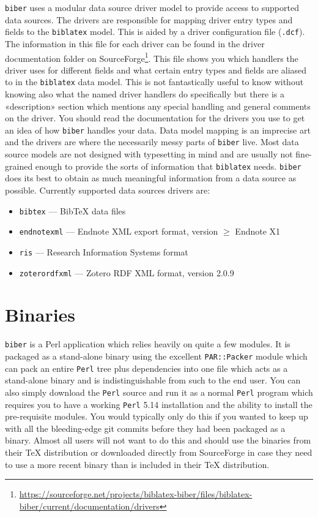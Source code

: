 \documentclass{ltxdockit}
\begin{document}
\verb+biber+ uses a modular data source driver model to provide access
to supported data sources. The drivers are responsible for mapping
driver entry types and fields to the \verb+biblatex+ model. This is
aided by a driver configuration file (\verb+.dcf+). The information in
this file for each driver can be found in the driver documentation folder on
SourceForge\footnote{\url{https://sourceforge.net/projects/biblatex-biber/files/biblatex-biber/current/documentation/drivers}}. This
file shows you which handlers the driver uses for different fields and
what certain entry types and fields are aliased to in the
\verb+biblatex+ data model. This is not fantastically useful to know
without knowing also what the named driver handlers do specifically but there
is a «description» section which mentions any special handling and
general comments on the driver. You should read the documentation for
the drivers you use to get an idea of how \verb+biber+ handles your
data. Data model mapping is an imprecise art
and the drivers are where the necessarily messy parts of \verb+biber+
live. Most data source models are not designed with typesetting in
mind and are usually not fine-grained enough to provide the sorts of
information that \verb+biblatex+ needs. \verb+biber+ does its best to
obtain as much meaningful information from a data source as possible.
Currently supported data sources drivers are:

\begin{itemize}
\item \verb+bibtex+ --- BibTeX data files
\item \verb+endnotexml+ --- Endnote XML export format, version $\geq$ Endnote X1
\item \verb+ris+ --- Research Information Systems format
\item \verb+zoterordfxml+ --- Zotero RDF XML format, version 2.0.9
\end{itemize}

\section{Binaries}\label{binaries}

\verb+biber+ is a Perl application which relies heavily on quite a few
modules. It is packaged as a stand-alone binary using the excellent
\verb+PAR::Packer+ module which can pack an entire \verb+Perl+ tree plus
dependencies into one file which acts as a stand-alone binary and is
indistinguishable from such to the end user. You can also simply download
the \verb+Perl+ source and run it as a normal \verb+Perl+ program which
requires you to have a working \verb+Perl+ 5.14 installation and the
ability to install the pre-requisite modules. You would typically only do
this if you wanted to keep up with all the bleeding-edge git commits before
they had been packaged as a binary. Almost all users will not want to do
this and should use the binaries from their TeX distribution or downloaded
directly from SourceForge in case they need to use a more recent binary
than is included in their TeX distribution.
\end{document}
